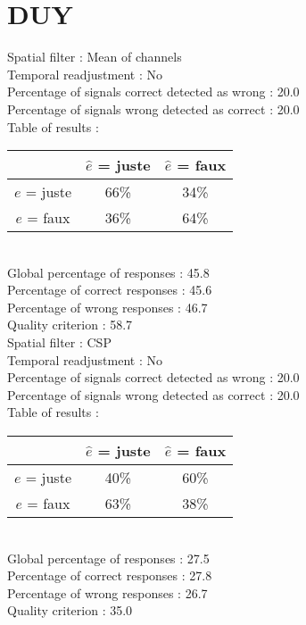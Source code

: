 \section*{DUY}
Spatial filter : Mean of channels \\
Temporal readjustment : No \\
Percentage of signals correct detected as wrong :   20.0 \\
Percentage of signals wrong detected as correct :   20.0 \\
Table of results : \\
\begin{tabular}{|c|c|c|}
\hline				& $\hat{e}$ = juste & $\hat{e}$ = faux \\
\hline  $e$ = juste	&     66\%			&     34\%		\\
\hline  $e$ = faux	&     36\%			&     64\%		\\
\hline
\end{tabular}\\
Global percentage of responses :   45.8 \\
Percentage of correct responses :   45.6 \\
Percentage of wrong responses :   46.7 \\
Quality criterion :   58.7 \\

Spatial filter : CSP \\
Temporal readjustment : No \\
Percentage of signals correct detected as wrong :   20.0 \\
Percentage of signals wrong detected as correct :   20.0 \\
Table of results : \\
\begin{tabular}{|c|c|c|}
\hline				& $\hat{e}$ = juste & $\hat{e}$ = faux \\
\hline  $e$ = juste	&     40\%			&     60\%		\\
\hline  $e$ = faux	&     63\%			&     38\%		\\
\hline
\end{tabular}\\
Global percentage of responses :   27.5 \\
Percentage of correct responses :   27.8 \\
Percentage of wrong responses :   26.7 \\
Quality criterion :   35.0 \\

